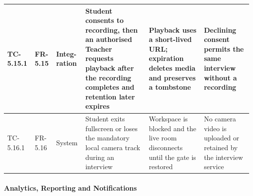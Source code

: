 \begin{longtable}{|>{\centering\arraybackslash}m{}|>{\centering\arraybackslash}m{}|>{\centering\arraybackslash}m{}|m{}|m{}|m{}|}
TC-5.15.1 & FR-5.15 & Integ-ration & Student consents to recording, then an authorised Teacher requests playback after the recording completes and retention later expires & Playback uses a short-lived URL; expiration deletes media and preserves a tombstone & Declining consent permits the same interview without a recording \\ \hline

TC-5.16.1 & FR-5.16 & System & Student exits fullscreen or loses the mandatory local camera track during an interview & Workspace is blocked and the live room disconnects until the gate is restored & No camera video is uploaded or retained by the interview service \\ \hline

\end{longtable}


\paragraph{Analytics, Reporting and Notifications}

